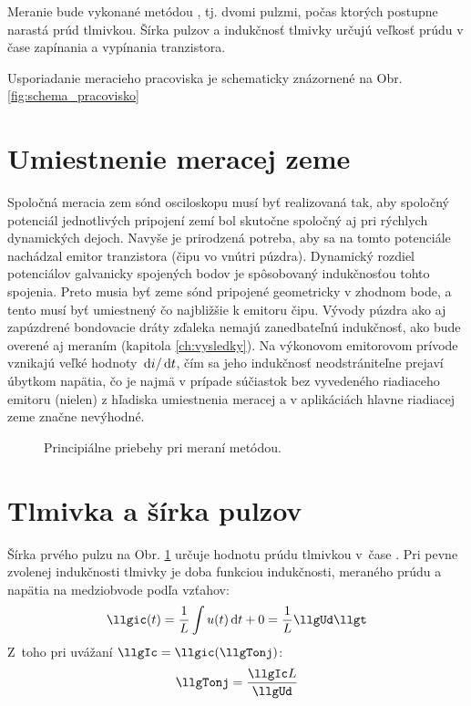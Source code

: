 Meranie bude vykonané metódou , tj. dvomi pulzmi, počas ktorých postupne narastá prúd tlmivkou. Šírka pulzov a indukčnosť tlmivky určujú veľkosť prúdu v čase zapínania a vypínania tranzistora.


Usporiadanie meracieho pracoviska je schematicky znázornené na Obr. \ref{fig:schema_pracovisko}

\section{Umiestnenie meracej zeme} \label{sec:umiestnenie_meracej_zeme}
Spoločná meracia zem sónd osciloskopu musí byť realizovaná tak, aby spoločný potenciál jednotlivých pripojení zemí bol skutočne spoločný aj pri rýchlych dynamických dejoch. Navyše je prirodzená potreba, aby sa na tomto potenciále nachádzal emitor tranzistora (čipu vo vnútri púzdra). Dynamický rozdiel potenciálov galvanicky spojených bodov je spôsobovaný indukčnosťou tohto spojenia. Preto musia byť zeme sónd pripojené geometricky v zhodnom bode, a tento musí byť umiestnený čo najbližšie k emitoru čipu. Vývody púzdra ako aj zapúzdrené bondovacie dráty zďaleka nemajú zanedbateľnú indukčnosť, ako bude overené aj meraním (kapitola \ref{ch:vysledky}). Na výkonovom emitorovom prívode vznikajú veľké hodnoty $\, \mathrm{d}{i}/\, \mathrm{d}{t}$, čím sa jeho indukčnosť neodstrániteľne prejaví úbytkom napätia, čo je najmä v prípade súčiastok bez vyvedeného riadiaceho emitoru (nielen) z hľadiska umiestnenia meracej a v aplikáciách hlavne riadiacej zeme značne nevýhodné.


\begin{figure}[!ht]
	\centering
	
	\caption{Principiálne priebehy pri meraní  metódou.}
	\label{fig:priebehy_1}
\end{figure}



\section{Tlmivka a šírka pulzov} \label{sc:pulzy}
Šírka prvého pulzu \llgTonj na Obr. \ref{fig:priebehy_1} určuje hodnotu prúdu tlmivkou v~čase \llgtj. Pri pevne zvolenej indukčnosti tlmivky je doba \llgTonj funkciou indukčnosti, meraného prúdu \llgIc a napätia na medziobvode \llgUd podľa vzťahov:
\begin{equation}
	\llgic(t) = \frac{1}{L} \int u(t) \dif t + 0 = \frac{1}{L} \llgUd \llgt
	\label{eq:ic=(U/L)*t}
\end{equation}
Z~toho pri uvážaní $\llgIc = \llgic(\llgTonj)$:
\begin{equation}
	\llgTonj = \frac{\llgIc L}{\llgUd}
	\label{eq:Ton1=Ic*L/Ud}
\end{equation}

